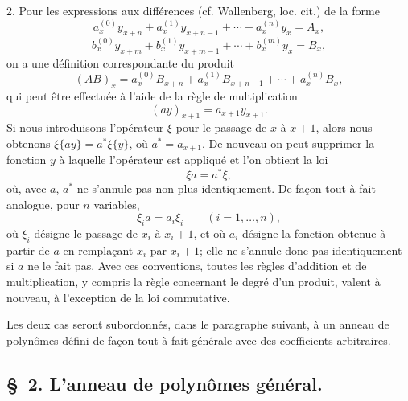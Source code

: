 2. Pour les expressions aux différences (cf. Wallenberg, loc. cit.) de la forme
\[
 a_x^{(0)}y_{x+n}+a_x^{(1)}y_{x+n-1}+\cdots+a_x^{(n)}y_x=A_x,
\]
\[
 b_x^{(0)}y_{x+m}+b_x^{(1)}y_{x+m-1}+\cdots+b_x^{(m)}y_x=B_x,
\]
on a une définition correspondante du produit
\[
 (AB)_x=a_x^{(0)}B_{x+n}+a_x^{(1)}B_{x+n-1}+\cdots+a_x^{(n)}B_x,
\]
qui peut être effectuée à l'aide de la règle de multiplication
\[
 (ay)_{x+1}=a_{x+1}y_{x+1}.
\]
Si nous introduisons l'opérateur $\xi$ pour le passage de $x$ à $x+1$, alors nous obtenons $\xi\{ay\}=a^*\xi\{y\}$, où $a^*=a_{x+1}$. De nouveau on peut supprimer la fonction $y$ à laquelle l'opérateur est appliqué et l'on obtient la loi
\begin{equation}
 \xi a=a^*\xi,
\tag{3}
\end{equation}
où, avec $a$, $a^*$ ne s'annule pas non plus identiquement. De façon tout à fait analogue, pour $n$ variables,
\begin{equation}
 \xi_i a=a_i\xi_i\qquad (i=1,\ldots,n),
\tag{4}
\end{equation}
où $\xi_i$ désigne le passage de $x_i$ à $x_i+1$, et où $a_i$ désigne la fonction obtenue à partir de $a$ en remplaçant $x_i$ par $x_i+1$; elle ne s'annule donc pas identiquement si $a$ ne le fait pas. Avec ces conventions, toutes les règles d'addition et de multiplication, y compris la règle concernant le degré d'un produit, valent à nouveau, à l'exception de la loi commutative.

Les deux cas seront subordonnés, dans le paragraphe suivant, à un anneau de polynômes défini de façon tout à fait générale avec des coefficients arbitraires.

\subsection*{\S~2. L'anneau de polynômes général.}


